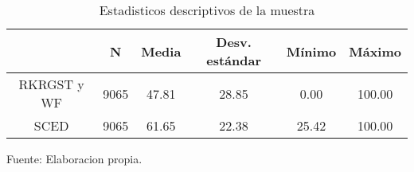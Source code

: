 \begin{table}[H]
\centering
\begin{tabular}{c|c|c|c|c|c|}
\cline{2-6}
                                & N    & Media & Desv. estándar & Mínimo & Máximo \\ \hline
\multicolumn{1}{|c|}{RKRGST y WF} & 9065 & 47.81 & 28.85          & 0.00   & 100.00 \\ \hline
\multicolumn{1}{|c|}{SCED}      & 9065 & 61.65 & 22.38          & 25.42  & 100.00 \\ \hline
\end{tabular}
\caption{Estadisticos descriptivos de la muestra}
Fuente: Elaboracion propia.
\label{DescTable}
\end{table}
